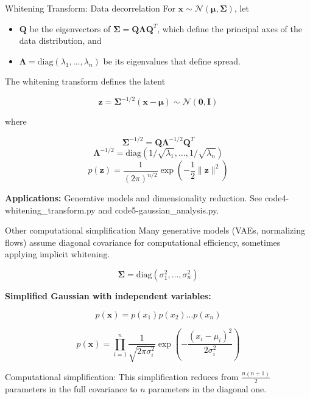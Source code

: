 \documentclass{beamer}
\newcommand{\x}{\mathbf{x}}
\newcommand{\z}{\mathbf{z}}
\newcommand{\bmu}{\boldsymbol{\mu}}
\newcommand{\bSigma}{\boldsymbol{\Sigma}}
\begin{document}
\begin{frame}{Whitening Transform: Data decorrelation}
  For $\x \sim \mathcal{N}(\bmu, \bSigma)$, let 
  \begin{itemize}
  \item $\mathbf{Q}$ be the \alert{eigenvectors} of
    $\bSigma=\mathbf{Q}\boldsymbol{\Lambda}\mathbf{Q}^T$, which define
    the principal axes of the data distribution, and
  \item $\boldsymbol{\Lambda} = \text{diag}(\lambda_1, \ldots,
    \lambda_n)$ be its \alert{eigenvalues} that define spread.
  \end{itemize}

\pause The \alert{whitening transform} defines the latent

$$\z = \bSigma^{-1/2}(\x - \bmu) \sim \mathcal{N}(\mathbf{0},
\mathbf{I}) $$

where

$$\bSigma^{-1/2} = \mathbf{Q}\boldsymbol{\Lambda}^{-1/2}\mathbf{Q}^T$$
$$\boldsymbol{\Lambda}^{-1/2} = \text{diag}(1/\sqrt{\lambda_1}, \ldots, 1/\sqrt{\lambda_n})$$
$$p(\z) = \frac{1}{(2\pi)^{n/2}} \exp\left(-\frac{1}{2}\|\z\|^2\right)$$

\textbf{Applications:} Generative models and dimensionality reduction. See code4-whitening\_transform.py and code5-gaussian\_analysis.py.

\end{frame}

\begin{frame}{Other computational simplification}
Many generative models (VAEs, normalizing flows) assume
\alert{diagonal covariance} for computational efficiency, sometimes
applying implicit whitening.

$$\bSigma = \text{diag}(\sigma_1^2, \ldots, \sigma_n^2)$$

\textbf{Simplified Gaussian with \alert{independent variables}:}

$$p(\x)=p(x_1)p(x_2)\ldots p(x_n)$$

$$p(\x) = \prod_{i=1}^n \frac{1}{\sqrt{2\pi\sigma_i^2}} \exp\left(-\frac{(x_i-\mu_i)^2}{2\sigma_i^2}\right)$$

\pause

\begin{alertblock}{Computational simplification:}
This simplification reduces from $\frac{n(n+1)}{2}$ parameters in the
full covariance to $n$ parameters in the diagonal one.
\end{alertblock}

\end{frame}
\end{document}
